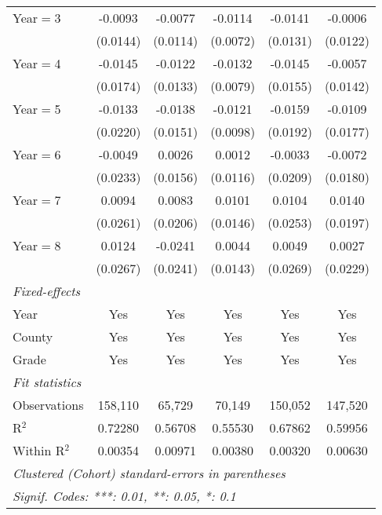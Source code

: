\begin{table}[htbp]
\begin{tabular}{lccccc}
      Year$=$3             & -0.0093        & -0.0077         & -0.0114         & -0.0141       & -0.0006\\
                           & (0.0144)       & (0.0114)        & (0.0072)        & (0.0131)      & (0.0122)\\
      Year$=$4             & -0.0145        & -0.0122         & -0.0132         & -0.0145       & -0.0057\\
                           & (0.0174)       & (0.0133)        & (0.0079)        & (0.0155)      & (0.0142)\\
      Year$=$5             & -0.0133        & -0.0138         & -0.0121         & -0.0159       & -0.0109\\
                           & (0.0220)       & (0.0151)        & (0.0098)        & (0.0192)      & (0.0177)\\
      Year$=$6             & -0.0049        & 0.0026          & 0.0012          & -0.0033       & -0.0072\\
                           & (0.0233)       & (0.0156)        & (0.0116)        & (0.0209)      & (0.0180)\\
      Year$=$7             & 0.0094         & 0.0083          & 0.0101          & 0.0104        & 0.0140\\
                           & (0.0261)       & (0.0206)        & (0.0146)        & (0.0253)      & (0.0197)\\
      Year$=$8             & 0.0124         & -0.0241         & 0.0044          & 0.0049        & 0.0027\\
                           & (0.0267)       & (0.0241)        & (0.0143)        & (0.0269)      & (0.0229)\\
      \midrule \emph{Fixed-effects} &   &   &   &   &  \\
      Year                 & Yes            & Yes             & Yes             & Yes           & Yes\\
      County               & Yes            & Yes             & Yes             & Yes           & Yes\\
      Grade                & Yes            & Yes             & Yes             & Yes           & Yes\\
      \midrule \emph{Fit statistics} &   &   &   &   &  \\
      Observations         & 158,110        & 65,729          & 70,149          & 150,052       & 147,520\\
      R$^2$                & 0.72280        & 0.56708         & 0.55530         & 0.67862       & 0.59956\\
      Within R$^2$         & 0.00354        & 0.00971         & 0.00380         & 0.00320       & 0.00630\\
      \midrule\midrule\multicolumn{6}{l}{\emph{Clustered (Cohort) standard-errors in parentheses}}\\
      \multicolumn{6}{l}{\emph{Signif. Codes: ***: 0.01, **: 0.05, *: 0.1}}\\
   \end{tabular}
\end{table}


